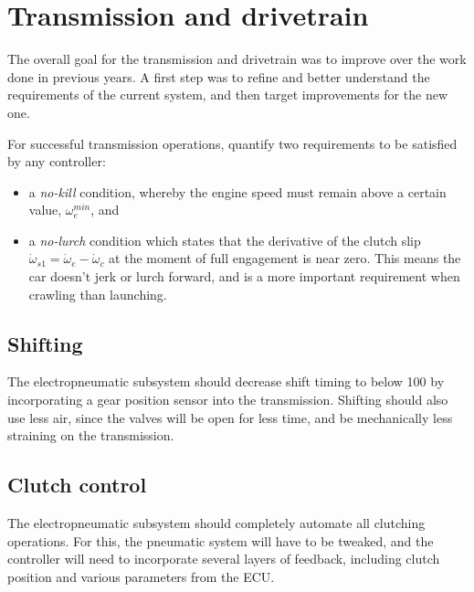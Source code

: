 \section{Transmission and drivetrain}

The overall goal for the transmission and drivetrain was to improve over the work done in previous years. A first step was to refine and better understand the requirements of the current system, and then target improvements for the new one.

For successful transmission operations, \citet{clutch_control} quantify two requirements to be satisfied by any controller:
\begin{itemize}
  \item a \emph{no-kill} condition, whereby the engine speed must remain above a certain value, $\omega_e^{min}$, and
  \item a \emph{no-lurch} condition which states that the derivative of the clutch slip $\dot{\omega}_{s1}=\dot{\omega}_e-\dot{\omega}_c$ at the moment of full engagement is near zero. This means the car doesn't jerk or lurch forward, and is a more important requirement when crawling than launching.
\end{itemize}

\subsection{Shifting}

The electropneumatic subsystem should decrease shift timing to below \unit{100}{\milli\second} by incorporating a gear position sensor into the transmission. Shifting should also use less air, since the valves will be open for less time, and be mechanically less straining on the transmission.

\subsection{Clutch control}

The electropneumatic subsystem should completely automate all clutching operations. For this, the pneumatic system will have to be tweaked, and the controller will need to incorporate several layers of feedback, including clutch position and various parameters from the ECU.

